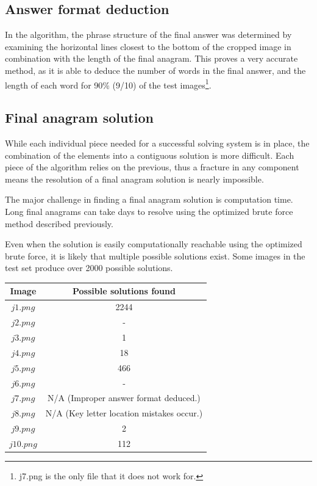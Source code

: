 \documentclass{article}
\begin{document}
	\subsection{Answer format deduction}
	In the algorithm, the phrase structure of the final answer was determined by examining the horizontal lines closest to the bottom of the cropped image in combination with the length of the final anagram. 
	This proves a very accurate method, as it is able to deduce the number of words in the final answer, and the length of each word for 90\% (9/10) of the test images\footnote{j7.png is the only file that it does not work for.}.
	
	\subsection{Final anagram solution}
	While each individual piece needed for a successful solving system is in place, the combination of the elements into a contiguous solution is more difficult.  Each piece of the algorithm relies on the previous, thus a fracture in any component means the resolution of a final anagram solution is nearly impossible.  \par \hspace{10pt}
	The major challenge in finding a final anagram solution is computation time.  Long final anagrams can take days to resolve using the optimized brute force method described previously. \par \hspace{10pt}
	Even when the solution is easily computationally reachable using the optimized brute force, it is likely that multiple possible solutions exist.  Some images in the test set produce over 2000 possible solutions. \par
	 
	 \begin{center}
	 	\begin{tabular}{ |c||c| } 
	 		\hline
	 		Image & Possible solutions found \\
	 		\hline
	 		$j1.png$ & 2244 \\
	 		$j2.png$ & -\\
	 		$j3.png$ & 1 \\
	 		$j4.png$ & 18 \\
	 		$j5.png$ & 466 \\
	 		$j6.png$ & - \\
	 		$j7.png$ & N/A (Improper answer format deduced.) \\
	 		$j8.png$ & N/A (Key letter location mistakes occur.) \\
	 		$j9.png$ & 2 \\
	 		$j10.png$ & 112 \\
	 		\hline 	
	 	\end{tabular}
	 \end{center}
 
\end{document}
